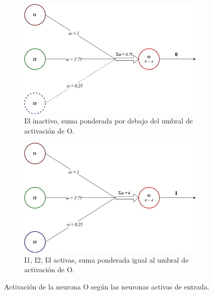 \begin{figure}[h]
    \centering
    \begin{subfigure}{.45\textwidth}
        \centering
        \includegraphics[scale=0.22]{cap2_contextualizacion/images/red_neuronal_inactive.png}
        \caption{I3 inactivo, suma ponderada por debajo del umbral de activación de O.}
        \label{fig:red_neuronal_inactiva}
    \end{subfigure}      
    \begin{subfigure}{.45\textwidth}
        \centering
        \includegraphics[scale=0.22]{cap2_contextualizacion/images/red_neuronal_active.png}
        \caption{I1, I2, I3 activas, suma ponderada igual al umbral de activación de O.}
        \label{fig:red_neuronal_activa}
    \end{subfigure}
    \caption{Activación de la neurona O según las neuronas activas de entrada.}
    \label{fig:red_neuronal_activacion}
\end{figure}

